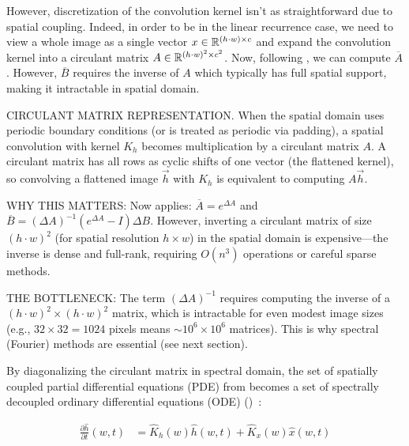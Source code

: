 However, discretization of the convolution kernel isn't as straightforward due to spatial coupling. Indeed, in order to be in the linear recurrence case, we need to view a whole image as a single vector $x\in \mathbb{R}^{(h\cdot w) \times c}$ and expand the convolution kernel into a circulant matrix $A \in \mathbb{R}^{(h\cdot w)^2 \times c^2}$. Now, following , we can compute $\overline{A}$. However, $\overline{B}$ requires the inverse of $A$ which typically has full spatial support, making it intractable in spatial domain.

\begin{ThomasAnnotation}
  CIRCULANT MATRIX REPRESENTATION. When the spatial domain uses periodic boundary conditions (or is treated as periodic via padding), a spatial convolution with kernel $K_h$ becomes multiplication by a circulant matrix $A$. A circulant matrix has all rows as cyclic shifts of one vector (the flattened kernel), so convolving a flattened image $\vec{h}$ with $K_h$ is equivalent to computing $A \vec{h}$.
  
  WHY THIS MATTERS: Now  applies: $\overline{A} = e^{\Delta A}$ and $\overline{B} = (\Delta A)^{-1}(e^{\Delta A} - I)\Delta B$. However, inverting a circulant matrix of size $(h \cdot w)^2$ (for spatial resolution $h \times w$) in the spatial domain is expensive---the inverse is dense and full-rank, requiring $O(n^3)$ operations or careful sparse methods.
  
  THE BOTTLENECK: The term $(\Delta A)^{-1}$ requires computing the inverse of a $(h \cdot w)^2 \times (h \cdot w)^2$ matrix, which is intractable for even modest image sizes (e.g., $32 \times 32 = 1024$ pixels means $\sim 10^6 \times 10^6$ matrices). This is why spectral (Fourier) methods are essential (see next section).
\end{ThomasAnnotation}

By diagonalizing the circulant matrix in spectral domain, the set of spatially coupled partial differential equations (PDE) from  becomes a set of spectrally decoupled ordinary differential equations (ODE) ()~:

\begin{minipage}[t]{.45\linewidth}
  \begin{subequations}
    \begin{align}
    \label{eq:conv_ssm_continuous_spectral}
      \frac{\partial \widehat{h}}{\partial t}(w,t) &= \widehat{K}_h(w) \widehat{h}(w, t) + \widehat{K}_x(w) \widehat{x}(w, t)
    \end{align}
  \end{subequations}
\end{minipage}%

